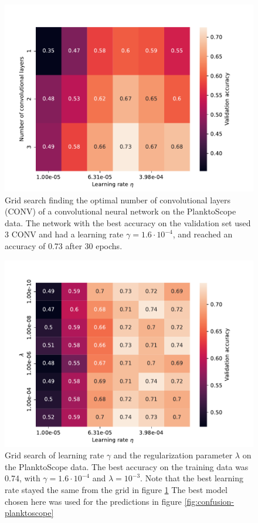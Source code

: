 \begin{figure}
    \centering
    \includegraphics[width=\linewidth]{examples/tests_even/figs/gridsearch-nconv-128-2024-12-12_1108.pdf}
    \caption{Grid search finding the optimal number of convolutional layers (CONV) of a convolutional neural network on the PlanktoScope data. The network with the best accuracy on the validation set used 3 CONV and had a learning rate $\gamma = 1.6 \cdot 10^{-4}$, and reached an accuracy of 0.73 after 30 epochs.}
    \label{fig:gridsearch-nconv}
\end{figure}

\begin{figure}
    \centering
    \includegraphics[width=\linewidth]{examples/tests_even/figs/gridsearch-128-2024-12-06_1241.pdf}
    \caption{Grid search of learning rate $\gamma$ and the regularization parameter $\lambda$ on the PlanktoScope data. The best accuracy on the training data was 0.74, with $\gamma = 1.6 \cdot 10^{-4}$ and $\lambda=10^{-3}$. Note that the best learning rate stayed the same from the grid in figure \ref{fig:gridsearch-nconv} The best model chosen here was used for the predictions in figure \ref{fig:confusion-planktoscope}}
    \label{fig:gridsearch-planktoscope}
\end{figure}


